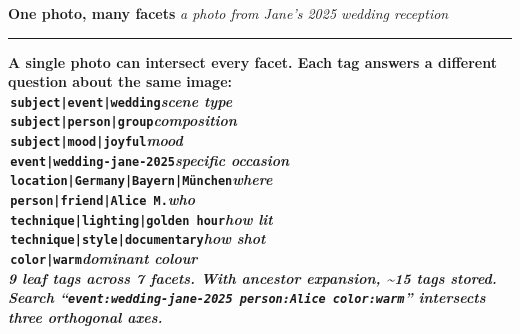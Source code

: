 \documentclass[a3paper,landscape,10pt]{article}
\newcommand{\cmd}[1]{\texttt{\small #1}}
\newcommand{\secthead}[2]{%
  \textcolor{maki-salmon}{\bfseries\normalsize #1}\hspace{1em}%
  \textcolor{maki-stone}{\footnotesize\itshape #2}\\[2pt]%
  {\color{maki-salmon!40}\hrule height 0.4pt}\vspace{6pt}%
}
\begin{document}
\begin{minipage}[t]{0.335\textwidth}
  \secthead{One photo, many facets}{a photo from Jane's 2025 wedding reception}

  \newcommand{\fdot}[1]{\raisebox{0.15ex}{\color{#1}\rule{0.6em}{0.6em}}\,}

  \begin{tcolorbox}[colback=maki-cream, colframe=maki-nori, boxrule=0.6pt, arc=3pt,
      left=8pt, right=8pt, top=6pt, bottom=6pt]
    \raggedright
    \small\bfseries\color{maki-nori}
    A single photo can intersect every facet. Each tag answers a
    different question about the same image:\\[4pt]

    \scriptsize\normalfont
    \setlength{\parskip}{1.5pt}
    \fdot{fc-subject}\cmd{subject|event|wedding}\hfill{\color{maki-stone}\itshape scene type}\\
    \fdot{fc-subject}\cmd{subject|person|group}\hfill{\color{maki-stone}\itshape composition}\\
    \fdot{fc-subject}\cmd{subject|mood|joyful}\hfill{\color{maki-stone}\itshape mood}\\
    \fdot{fc-event}\cmd{event|wedding-jane-2025}\hfill{\color{maki-stone}\itshape specific occasion}\\
    \fdot{fc-location}\cmd{location|Germany|Bayern|München}\hfill{\color{maki-stone}\itshape where}\\
    \fdot{fc-person}\cmd{person|friend|Alice M.}\hfill{\color{maki-stone}\itshape who}\\
    \fdot{fc-technique}\cmd{technique|lighting|golden hour}\hfill{\color{maki-stone}\itshape how lit}\\
    \fdot{fc-technique}\cmd{technique|style|documentary}\hfill{\color{maki-stone}\itshape how shot}\\
    \fdot{fc-color}\cmd{color|warm}\hfill{\color{maki-stone}\itshape dominant colour}\\[4pt]

    {\color{maki-stone}\itshape
    9 leaf tags across 7 facets. With ancestor expansion,
    \textasciitilde 15 tags stored. Search ``\cmd{event:wedding-jane-2025
    person:Alice color:warm}'' intersects three orthogonal axes.}
  \end{tcolorbox}

  \vspace{6pt}


\end{minipage}
\end{document}
